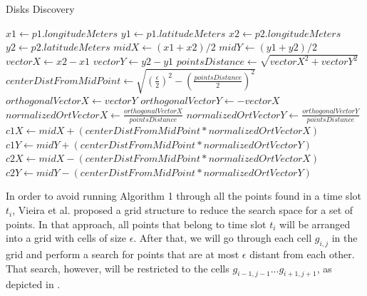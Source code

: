 \begin{algorithm}
\caption{Disks Discovery}
\begin{algorithmic}[1]
    \State $x1 \gets p1.longitudeMeters$
    \State $y1 \gets p1.latitudeMeters$
    \State $x2 \gets p2.longitudeMeters$
    \State $y2 \gets p2.latitudeMeters$
    \State
    \State $midX \gets (x1 + x2) / 2$
    \State $midY \gets (y1 + y2) / 2$
    \State
    \State $vectorX \gets x2 - x1$
    \State $vectorY \gets y2 - y1$
    \State
    \State $pointsDistance \gets \sqrt{vectorX^2 + vectorY^2}$
    \State $centerDistFromMidPoint \gets \sqrt{(\frac{\epsilon}{2})^2 - (\frac{pointsDistance}{2})^2}$
    \State
    \State $orthogonalVectorX \gets vectorY$
    \State $orthogonalVectorY \gets -vectorX$
    \State
    \State $normalizedOrtVectorX \gets \frac{orthogonalVectorX}{pointsDistance}$
    \State $normalizedOrtVectorY \gets \frac{orthogonalVectorY}{pointsDistance}$
    \State
    \State $c1X \gets midX + (centerDistFromMidPoint * normalizedOrtVectorX)$
    \State $c1Y \gets midY + (centerDistFromMidPoint * normalizedOrtVectorY)$
    \State
    \State $c2X \gets midX - (centerDistFromMidPoint * normalizedOrtVectorX)$
    \State $c2Y \gets midY - (centerDistFromMidPoint * normalizedOrtVectorY)$
\end{algorithmic}
\end{algorithm}

In order to avoid running Algorithm 1 through all the points found in a time slot $t_i$, Vieira et al. \citep{vieira}
proposed a grid structure to reduce the search space for a set of points. In that approach, all points that belong to
time slot $t_i$ will be arranged into a grid with cells of size $\epsilon$. After that, we will go through each cell
$g_{i,j}$ in the grid and perform a search for points that are at most $\epsilon$ distant from each other. That search, however, will
be restricted to the cells $g_{i - 1, j - 1} ... g_{i + 1, j + 1}$, as depicted in .

